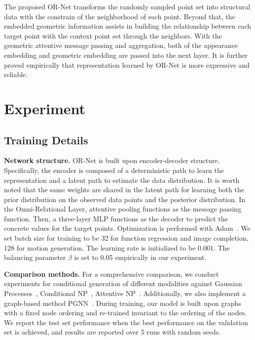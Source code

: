 \documentclass[sigconf]{acmart} %
\begin{document}
The proposed OR-Net transforms the randomly sampled point set into structural data with the constrain of the neighborhood of each point. Beyond that, the embedded geometric information assists in building the relationship between each target point with the context point set through the neighbors. With the geometric attentive message passing and aggregation, both of the appearance embedding and geometric embedding are passed into the next layer. It is further proved empirically that representation learned by OR-Net is more expressive and reliable.









\section{Experiment}

\subsection{Training Details}
\noindent\textbf{Network structure.} OR-Net is built upon encoder-decoder structure. Specifically, the encoder is composed of a deterministic path to learn the representation and a latent path to estimate the data distribution. It is worth noted that the same weights are shared in the latent path for learning both the prior distribution on the observed data points and the posterior distribution. In the Omni-Relational Layer, attentive pooling functions as the message passing function. Then, a three-layer MLP functions as the decoder to predict the concrete values for the target points. Optimization is performed with Adam~\cite{kingma2014method}. 
We set batch size for training to be 32 for function regression and image completion, 128 for motion generation. The learning rate is initialized to be 0.001.
The balancing parameter $\beta$ is set to 0.05 empirically in our experiment.

\noindent\textbf{Comparison methods.} For a comprehensive comparison, we conduct experiments for conditional generation of different modalities against Gaussian Processes~\cite{williams1996gaussian}, Conditional NP~\cite{garnelo2018conditional}, Attentive NP~\citep{kim2019attentive}. Additionally, we also implement a graph-based method PGNN~\cite{you2019position}. 
During training, our model is built upon graphs with a fixed node ordering and re-trained invariant to the ordering of the nodes. We report the test set performance when the best performance on the validation set is achieved, and results are reported over 5 runs with random seeds.
\end{document}
